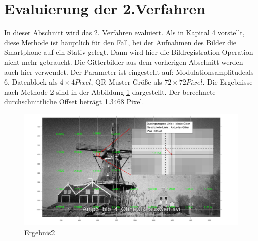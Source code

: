 \section{Evaluierung der 2.Verfahren}

In dieser Abschnitt wird das 2. Verfahren evaluiert. Als in Kapital 4 vorstellt, diese Methode ist häuptlich für den Fall, bei der Aufnahmen des Bilder die Smartphone auf ein Stativ gelegt. Dann wird hier die Bildregistration Operation nicht mehr gebraucht. Die Gitterbilder aus dem vorherigen Abschnitt werden auch hier verwendet. Der Parameter ist eingestellt auf: Modulationsamplitudeals 6, Datenblock als $ 4 \times 4 Pixel$, QR Muster Größe als $ 72 \times 72 Pixel $. Die Ergebnisse nach Methode 2 sind in der Abbildung \ref{fig:Ergebnis2} dargestellt.
Der berechnete durchschnittliche Offset beträgt 1.3468 Pixel. 
\begin{figure}[H]
 \centering 
  \includegraphics[keepaspectratio,width=1.00\textwidth]{images/6_Auswertung/Ergebnis2.pdf}
 \caption{Ergebnis2}
 \label{fig:Ergebnis2}
\end{figure}